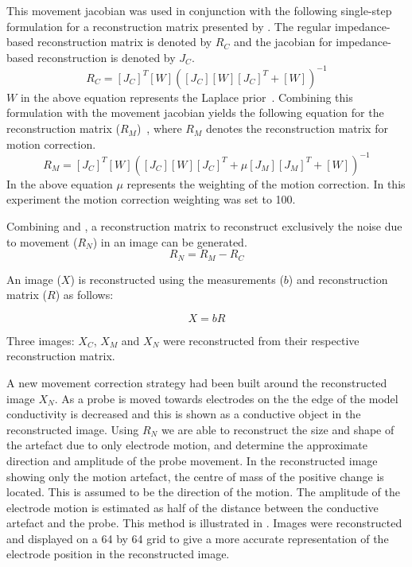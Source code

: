 This movement jacobian was used in conjunction with the following single-step 
formulation for a reconstruction matrix presented 
by . The regular impedance-based 
reconstruction matrix is denoted by $R_C$ and the jacobian for impedance-based 
reconstruction is denoted by $J_C$.
\begin{equation}\label{eq:regular_rm}
	R_C = [J_C]^T [W]\left([J_C] [W] [J_C]^T + [W]\right)^{-1}
\end{equation}
$W$ in the above equation represents the Laplace prior~\parencite{soleimani_imaging_2006}.
Combining this formulation with the movement jacobian yields the following equation 
for the reconstruction matrix ($R_M$)~\parencite{soleimani_imaging_2006}, where $R_M$
denotes the reconstruction matrix for motion correction.
\begin{equation}\label{eq:motion_rm}
	R_M = [J_C]^T [W]([J_C] [W] [J_C]^T + \mu [J_M][J_M]^T + [W])^{-1}
\end{equation}
In the above equation $\mu$ represents the weighting of the motion correction. 
In this experiment the motion correction weighting was set to 100. 

Combining  and , a reconstruction
matrix to reconstruct exclusively the noise due to movement ($R_N$) 
in an image can be generated.
\begin{equation} \label{eq:noise_rm}
	R_N = R_M - R_C
\end{equation}

%

An image ($X$) is reconstructed using 
the measurements ($b$) and reconstruction matrix ($R$) as follows:

\begin{equation}
	X = bR
\end{equation}

Three images: $X_C$, $X_M$ and $X_N$ were reconstructed from their 
respective reconstruction matrix. 

A new movement correction strategy had been built 
around the reconstructed image $X_N$.
As a probe is moved towards electrodes on the the edge of the model 
conductivity is decreased and this is shown as a conductive object in the reconstructed 
image. Using $R_N$ we are able to reconstruct the 
size and shape of the artefact due to only electrode motion,
and determine the approximate direction and amplitude of
the probe movement.
In the reconstructed image 
showing only the motion artefact,
the centre of mass of the positive change is located. 
This is assumed to be the direction of the motion. The amplitude of the electrode 
motion is estimated as half of the distance between the 
conductive artefact and the probe. This method is illustrated in
. Images were reconstructed and displayed 
on a 64 by 64 grid to give a more accurate representation of the 
electrode position in the reconstructed image.

